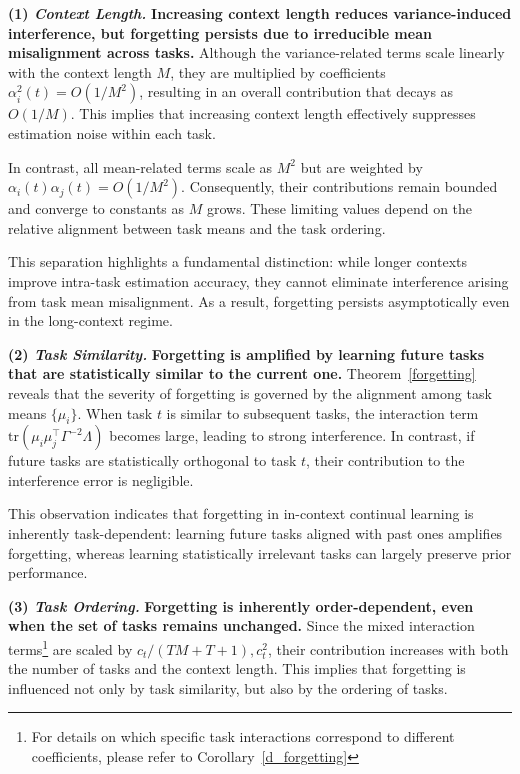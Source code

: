 \documentclass{article}
\theoremstyle{plain}
\theoremstyle{definition}
\theoremstyle{remark}
\begin{document}
\noindent \textbf{(1) \textit{Context Length.}} \textbf{Increasing context length reduces variance-induced interference, but forgetting persists due to irreducible mean misalignment across tasks.}
Although the variance-related terms scale linearly with the context length $M$, they are multiplied by coefficients $\alpha_i^2(t)=O(1/M^2)$, resulting in an overall contribution that decays as $O(1/M)$.
This implies that increasing context length effectively suppresses estimation noise within each task.

In contrast, all mean-related terms scale as $M^2$ but are weighted by $\alpha_i(t)\alpha_j(t)=O(1/M^2)$.
Consequently, their contributions remain bounded and converge to constants as $M$ grows.
These limiting values depend on the relative alignment between task means and the task ordering.

This separation highlights a fundamental distinction: while longer contexts improve intra-task estimation accuracy, they cannot eliminate interference arising from task mean misalignment.
As a result, forgetting persists asymptotically even in the long-context regime.

\noindent \textbf{(2) \textit{Task Similarity.}} \textbf{Forgetting is amplified by learning future tasks that are statistically similar to the current one.}
Theorem~\ref{forgetting} reveals that the severity of forgetting is governed by the alignment among task means $\{\mu_i\}$. When task $t$ is similar to subsequent tasks, the interaction term $\mathrm{tr}(\mu_i\mu_j^\top\Gamma^{-2}\Lambda)$ becomes large, leading to strong interference. In contrast, if future tasks are statistically orthogonal to task $t$, their contribution to the interference error is negligible.

This observation indicates that forgetting in in-context continual learning is inherently task-dependent: learning future tasks aligned with past ones amplifies forgetting, whereas learning statistically irrelevant tasks can largely preserve prior performance.

\noindent \textbf{(3) \textit{Task Ordering.}} \textbf{Forgetting is inherently order-dependent, even when the set of tasks remains unchanged.} Since the mixed interaction terms\footnote{For details on which specific task interactions correspond to different coefficients, please refer to Corollary~\ref{d_forgetting}} are scaled by $c_t/(TM+T+1), c_t^2$, their contribution increases with both the number of tasks and the context length. This implies that forgetting is influenced not only by task similarity, but also by the ordering of tasks.
\end{document}
